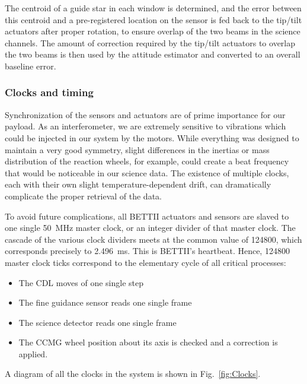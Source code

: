 The centroid of a guide star in each window is determined, and the error between this centroid and a pre-registered location on the sensor is fed back to the tip/tilt actuators after proper rotation, to ensure overlap of the two beams in the science channels. The amount of correction required by the tip/tilt actuators to overlap the two beams is then used by the attitude estimator and converted to an overall baseline error. 

\subsubsection{Clocks and timing}

Synchronization of the sensors and actuators are of prime importance for our payload. As an interferometer, we are extremely sensitive to vibrations which could be injected in our system by the motors. While everything was designed to maintain a very good symmetry, slight differences in the inertias or mass distribution of the reaction wheels, for example, could create a beat frequency that would be noticeable in our science data. The existence of multiple clocks, each with their own slight temperature-dependent drift, can dramatically complicate the proper retrieval of the data.

To avoid future complications, all BETTII actuators and sensors are slaved to one single \SI{50}{\mega\hertz} master clock, or an integer divider of that master clock. The cascade of the various clock dividers meets at the common value of \num{124800}, which corresponds precisely to \SI{2.496}{\milli\second}. This is BETTII's heartbeat. Hence, \num{124800} master clock ticks correspond to the elementary cycle of all critical processes:
\begin{itemize}
\item The CDL moves of one single step
\item The fine guidance sensor reads one single frame
\item The science detector reads one single frame
\item The CCMG wheel position about its axis is checked and a correction is applied.
\end{itemize}
A diagram of all the clocks in the system is shown in Fig.~\ref{fig:Clocks}.

